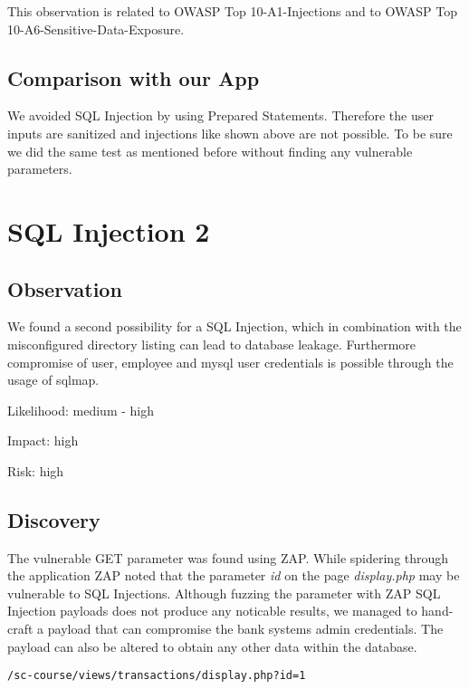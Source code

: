 This observation is related to OWASP Top 10-A1-Injections and to OWASP Top 10-A6-Sensitive-Data-Exposure.

\subsection{Comparison with our App}
We avoided SQL Injection by using Prepared Statements. Therefore the user inputs are sanitized and injections like shown above are not possible. To be sure we did the same test as mentioned before without finding any vulnerable parameters.

\section{SQL Injection 2}
\label{chapter:sql_injection2}


\subsection{Observation}

We found a second possibility for a SQL Injection, which in combination with the misconfigured directory listing can lead to database leakage. Furthermore compromise of user, employee and mysql user credentials is possible through the usage of sqlmap.\newline

Likelihood:  medium - high\newline

Impact: high\newline

Risk: high\newline

\subsection{Discovery}

The vulnerable GET parameter was found using ZAP. While spidering through the application ZAP noted that the parameter \emph{id} on the page \emph{display.php} may be vulnerable to SQL Injections. Although fuzzing the parameter with ZAP SQL Injection payloads does not produce any noticable results, we managed to hand-craft a payload that can compromise the bank systems admin credentials. The payload can also be altered to obtain any other data within the database.

\begin{lstlisting}[caption= The vulnerable parameter, label=listing:injection2parameter]
/sc-course/views/transactions/display.php?id=1
\end{lstlisting}


